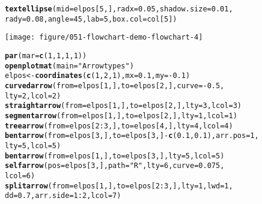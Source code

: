 \documentclass{article}\usepackage[]{graphicx}\usepackage[]{xcolor}
\makeatletter
\def\maxwidth{ %
  \ifdim\Gin@nat@width>\linewidth
    \linewidth
  \else
    \Gin@nat@width
  \fi
}
\newcommand{\hlnum}[1]{\textcolor[rgb]{0.686,0.059,0.569}{#1}}%
\newcommand{\hlsng}[1]{\textcolor[rgb]{0.192,0.494,0.8}{#1}}%
\newcommand{\hlopt}[1]{\textcolor[rgb]{0,0,0}{#1}}%
\newcommand{\hldef}[1]{\textcolor[rgb]{0.345,0.345,0.345}{#1}}%
\newcommand{\hlkwb}[1]{\textcolor[rgb]{0.69,0.353,0.396}{#1}}%
\newcommand{\hlkwc}[1]{\textcolor[rgb]{0.333,0.667,0.333}{#1}}%
\newcommand{\hlkwd}[1]{\textcolor[rgb]{0.737,0.353,0.396}{\textbf{#1}}}%
\newenvironment{kframe}{%
 \def\at@end@of@kframe{}%
 \ifinner\ifhmode%
  \def\at@end@of@kframe{\end{minipage}}%
  \begin{minipage}{\columnwidth}%
 \fi\fi%
 \def\FrameCommand##1{\hskip\@totalleftmargin \hskip-\fboxsep
 \colorbox{shadecolor}{##1}\hskip-\fboxsep
     \hskip-\linewidth \hskip-\@totalleftmargin \hskip\columnwidth}%
 \MakeFramed {\advance\hsize-\width
   \@totalleftmargin\z@ \linewidth\hsize
   \@setminipage}}%
 {\par\unskip\endMakeFramed%
 \at@end@of@kframe}
\newenvironment{knitrout}{}{} %
\makeatother
\begin{document}
\begin{knitrout}
\begin{kframe}
\begin{alltt}
\hlkwd{textellipse}\hldef{(}\hlkwc{mid} \hldef{= elpos[}\hlnum{5}\hldef{, ],} \hlkwc{radx} \hldef{=} \hlnum{0.05}\hldef{,} \hlkwc{shadow.size} \hldef{=} \hlnum{0.01}\hldef{,}
    \hlkwc{rady} \hldef{=} \hlnum{0.08}\hldef{,} \hlkwc{angle} \hldef{=} \hlnum{45}\hldef{,} \hlkwc{lab} \hldef{=} \hlnum{5}\hldef{,} \hlkwc{box.col} \hldef{= col[}\hlnum{5}\hldef{])}
\end{alltt}
\end{kframe}
\texttt{[image: figure/051-flowchart-demo-flowchart-4]} 
\begin{kframe}\begin{alltt}
\hlkwd{par}\hldef{(}\hlkwc{mar} \hldef{=} \hlkwd{c}\hldef{(}\hlnum{1}\hldef{,} \hlnum{1}\hldef{,} \hlnum{1}\hldef{,} \hlnum{1}\hldef{))}
\hlkwd{openplotmat}\hldef{(}\hlkwc{main} \hldef{=} \hlsng{"Arrowtypes"}\hldef{)}
\hldef{elpos} \hlkwb{<-} \hlkwd{coordinates}\hldef{(}\hlkwd{c}\hldef{(}\hlnum{1}\hldef{,} \hlnum{2}\hldef{,} \hlnum{1}\hldef{),} \hlkwc{mx} \hldef{=} \hlnum{0.1}\hldef{,} \hlkwc{my} \hldef{=} \hlopt{-}\hlnum{0.1}\hldef{)}
\hlkwd{curvedarrow}\hldef{(}\hlkwc{from} \hldef{= elpos[}\hlnum{1}\hldef{, ],} \hlkwc{to} \hldef{= elpos[}\hlnum{2}\hldef{, ],} \hlkwc{curve} \hldef{=} \hlopt{-}\hlnum{0.5}\hldef{,}
    \hlkwc{lty} \hldef{=} \hlnum{2}\hldef{,} \hlkwc{lcol} \hldef{=} \hlnum{2}\hldef{)}
\hlkwd{straightarrow}\hldef{(}\hlkwc{from} \hldef{= elpos[}\hlnum{1}\hldef{, ],} \hlkwc{to} \hldef{= elpos[}\hlnum{2}\hldef{, ],} \hlkwc{lty} \hldef{=} \hlnum{3}\hldef{,} \hlkwc{lcol} \hldef{=} \hlnum{3}\hldef{)}
\hlkwd{segmentarrow}\hldef{(}\hlkwc{from} \hldef{= elpos[}\hlnum{1}\hldef{, ],} \hlkwc{to} \hldef{= elpos[}\hlnum{2}\hldef{, ],} \hlkwc{lty} \hldef{=} \hlnum{1}\hldef{,} \hlkwc{lcol} \hldef{=} \hlnum{1}\hldef{)}
\hlkwd{treearrow}\hldef{(}\hlkwc{from} \hldef{= elpos[}\hlnum{2}\hlopt{:}\hlnum{3}\hldef{, ],} \hlkwc{to} \hldef{= elpos[}\hlnum{4}\hldef{, ],} \hlkwc{lty} \hldef{=} \hlnum{4}\hldef{,} \hlkwc{lcol} \hldef{=} \hlnum{4}\hldef{)}
\hlkwd{bentarrow}\hldef{(}\hlkwc{from} \hldef{= elpos[}\hlnum{3}\hldef{, ],} \hlkwc{to} \hldef{= elpos[}\hlnum{3}\hldef{, ]} \hlopt{-} \hlkwd{c}\hldef{(}\hlnum{0.1}\hldef{,} \hlnum{0.1}\hldef{),} \hlkwc{arr.pos} \hldef{=} \hlnum{1}\hldef{,}
    \hlkwc{lty} \hldef{=} \hlnum{5}\hldef{,} \hlkwc{lcol} \hldef{=} \hlnum{5}\hldef{)}
\hlkwd{bentarrow}\hldef{(}\hlkwc{from} \hldef{= elpos[}\hlnum{1}\hldef{, ],} \hlkwc{to} \hldef{= elpos[}\hlnum{3}\hldef{, ],} \hlkwc{lty} \hldef{=} \hlnum{5}\hldef{,} \hlkwc{lcol} \hldef{=} \hlnum{5}\hldef{)}
\hlkwd{selfarrow}\hldef{(}\hlkwc{pos} \hldef{= elpos[}\hlnum{3}\hldef{, ],} \hlkwc{path} \hldef{=} \hlsng{"R"}\hldef{,} \hlkwc{lty} \hldef{=} \hlnum{6}\hldef{,} \hlkwc{curve} \hldef{=} \hlnum{0.075}\hldef{,}
    \hlkwc{lcol} \hldef{=} \hlnum{6}\hldef{)}
\hlkwd{splitarrow}\hldef{(}\hlkwc{from} \hldef{= elpos[}\hlnum{1}\hldef{, ],} \hlkwc{to} \hldef{= elpos[}\hlnum{2}\hlopt{:}\hlnum{3}\hldef{, ],} \hlkwc{lty} \hldef{=} \hlnum{1}\hldef{,} \hlkwc{lwd} \hldef{=} \hlnum{1}\hldef{,}
    \hlkwc{dd} \hldef{=} \hlnum{0.7}\hldef{,} \hlkwc{arr.side} \hldef{=} \hlnum{1}\hlopt{:}\hlnum{2}\hldef{,} \hlkwc{lcol} \hldef{=} \hlnum{7}\hldef{)}


\end{alltt}
\end{kframe}
\end{knitrout}
\end{document}
